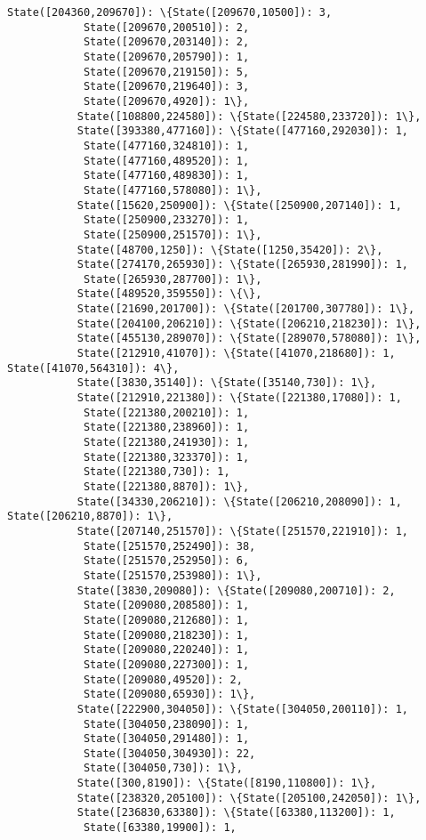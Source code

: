 \documentclass[11pt]{article}
\begin{document}
\begin{Verbatim}[commandchars=\\\{\}]
           State([204360,209670]): \{State([209670,10500]): 3,
            State([209670,200510]): 2,
            State([209670,203140]): 2,
            State([209670,205790]): 1,
            State([209670,219150]): 5,
            State([209670,219640]): 3,
            State([209670,4920]): 1\},
           State([108800,224580]): \{State([224580,233720]): 1\},
           State([393380,477160]): \{State([477160,292030]): 1,
            State([477160,324810]): 1,
            State([477160,489520]): 1,
            State([477160,489830]): 1,
            State([477160,578080]): 1\},
           State([15620,250900]): \{State([250900,207140]): 1,
            State([250900,233270]): 1,
            State([250900,251570]): 1\},
           State([48700,1250]): \{State([1250,35420]): 2\},
           State([274170,265930]): \{State([265930,281990]): 1,
            State([265930,287700]): 1\},
           State([489520,359550]): \{\},
           State([21690,201700]): \{State([201700,307780]): 1\},
           State([204100,206210]): \{State([206210,218230]): 1\},
           State([455130,289070]): \{State([289070,578080]): 1\},
           State([212910,41070]): \{State([41070,218680]): 1, State([41070,564310]): 4\},
           State([3830,35140]): \{State([35140,730]): 1\},
           State([212910,221380]): \{State([221380,17080]): 1,
            State([221380,200210]): 1,
            State([221380,238960]): 1,
            State([221380,241930]): 1,
            State([221380,323370]): 1,
            State([221380,730]): 1,
            State([221380,8870]): 1\},
           State([34330,206210]): \{State([206210,208090]): 1, State([206210,8870]): 1\},
           State([207140,251570]): \{State([251570,221910]): 1,
            State([251570,252490]): 38,
            State([251570,252950]): 6,
            State([251570,253980]): 1\},
           State([3830,209080]): \{State([209080,200710]): 2,
            State([209080,208580]): 1,
            State([209080,212680]): 1,
            State([209080,218230]): 1,
            State([209080,220240]): 1,
            State([209080,227300]): 1,
            State([209080,49520]): 2,
            State([209080,65930]): 1\},
           State([222900,304050]): \{State([304050,200110]): 1,
            State([304050,238090]): 1,
            State([304050,291480]): 1,
            State([304050,304930]): 22,
            State([304050,730]): 1\},
           State([300,8190]): \{State([8190,110800]): 1\},
           State([238320,205100]): \{State([205100,242050]): 1\},
           State([236830,63380]): \{State([63380,113200]): 1,
            State([63380,19900]): 1,

\end{Verbatim}
\end{document}

